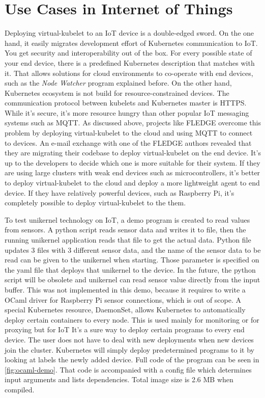 \section{Use Cases in Internet of Things}

Deploying virtual-kubelet to an IoT device is a double-edged sword. On the one hand, it easily migrates development effort of Kubernetes communication to IoT. You get security and interoperability out of the box. For every possible state of your end device, there is a predefined Kubernetes description that matches with it. That allows solutions for cloud environments to co-operate with end devices, such as the \textit{Node Watcher} program explained before. On the other hand, Kubernetes ecosystem is not build for resource-constrained devices. The communication protocol between kubelets and Kubernetes master is HTTPS. While it's secure, it's more resource hungry than other popular IoT messaging systems such as MQTT. As discussed above, projects like FLEDGE overcome this problem by deploying virtual-kubelet to the cloud and using MQTT to connect to devices. An e-mail exchange with one of the FLEDGE authors revealed that they are migrating their codebase to deploy virtual-kubelet on the end device. It's up to the developers to decide which one is more suitable for their system. If they are using large clusters with weak end devices such as microcontrollers, it's better to deploy virtual-kubelet to the cloud and deploy a more lightweight agent to end device. If they have relatively powerful devices, such as Raspberry Pi, it's completely possible to deploy virtual-kubelet to the them.

To test unikernel technology on IoT, a demo program is created to read values from sensors. A python script reads sensor data and writes it to file, then the running unikernel application reads that file to get the actual data. Python file updates 3 files with 3 different sensor data, and the name of the sensor data to be read can be given to the unikernel when starting. Those parameter is specified on the yaml file that deploys that unikernel to the device. In the future, the python script will be obsolete and unikernel can read sensor value directly from the input buffer. This was not implemented in this demo, because it requires to write a OCaml driver for Raspberry Pi sensor connections, which is out of scope. A special Kubernetes resource, DaemonSet, allows Kubernetes to automatically deploy certain containers to every node. This is used mainly for monitoring or for proxying but for IoT It's a sure way to deploy certain programs to every end device. The user does not have to deal with new deployments when new devices join the cluster. Kubernetes will simply deploy predetermined programs to it by looking at labels the newly added device. Full code of the program can be seen in \ref{fig:ocaml-demo}. That code is accompanied with a config file which determines input arguments and lists dependencies. Total image size is 2.6 MB when compiled.

